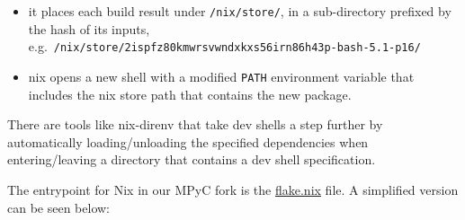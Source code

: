 \documentclass[
]{article}
\providecommand{\tightlist}{%
  \setlength{\itemsep}{0pt}\setlength{\parskip}{0pt}}
\begin{document}
\begin{itemize}
  \tightlist
  \item
        it places each build result under \texttt{/nix/store/}, in a
        sub-directory prefixed by the hash of its inputs,
        e.g.~\texttt{/nix/store/2ispfz80kmwrsvwndxkxs56irn86h43p-bash-5.1-p16/}
  \item
        nix opens a new shell with a modified \texttt{PATH} environment
        variable that includes the nix store path that contains the new
        package.
\end{itemize}

There are tools like nix-direnv that take dev shells a step further by
automatically loading/unloading the specified dependencies when
entering/leaving a directory that contains a dev shell specification.

\newpage

The entrypoint for Nix in our MPyC fork is the
\href{https://github.com/e-nikolov/mpyc/blob/master/flake.nix}{flake.nix}
file. A simplified version can be seen below:
\end{document}
